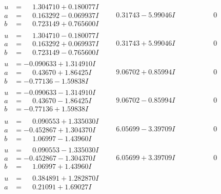 \documentclass[1p]{elsarticle_modified}
\theoremstyle{definition}
\begin{document}
$$\begin{array}{c|c|c}
 \hline 
\begin{aligned}
u &= \phantom{-}1.304710 + 0.180077 I \\
a &= \phantom{-}0.163292 - 0.069937 I \\
b &= \phantom{-}0.723149 + 0.765600 I\end{aligned}
 & \phantom{-}0.31743 - 5.99046 I & \phantom{-0.000000 } 0 \\ \hline\begin{aligned}
u &= \phantom{-}1.304710 - 0.180077 I \\
a &= \phantom{-}0.163292 + 0.069937 I \\
b &= \phantom{-}0.723149 - 0.765600 I\end{aligned}
 & \phantom{-}0.31743 + 5.99046 I & \phantom{-0.000000 } 0 \\ \hline\begin{aligned}
u &= -0.090633 + 1.314910 I \\
a &= \phantom{-}0.43670 + 1.86425 I \\
b &= -0.77136 - 1.59838 I\end{aligned}
 & \phantom{-}9.06702 + 0.85994 I & \phantom{-0.000000 } 0 \\ \hline\begin{aligned}
u &= -0.090633 - 1.314910 I \\
a &= \phantom{-}0.43670 - 1.86425 I \\
b &= -0.77136 + 1.59838 I\end{aligned}
 & \phantom{-}9.06702 - 0.85994 I & \phantom{-0.000000 } 0 \\ \hline\begin{aligned}
u &= \phantom{-}0.090553 + 1.335030 I \\
a &= -0.452867 + 1.304370 I \\
b &= \phantom{-}1.06997 - 1.43960 I\end{aligned}
 & \phantom{-}6.05699 - 3.39709 I & \phantom{-0.000000 } 0 \\ \hline\begin{aligned}
u &= \phantom{-}0.090553 - 1.335030 I \\
a &= -0.452867 - 1.304370 I \\
b &= \phantom{-}1.06997 + 1.43960 I\end{aligned}
 & \phantom{-}6.05699 + 3.39709 I & \phantom{-0.000000 } 0 \\ \hline\begin{aligned}
u &= \phantom{-}0.384891 + 1.282870 I \\
a &= \phantom{-}0.21091 + 1.69027 I \\

\end{aligned}
\end{array}$$
\end{document}
